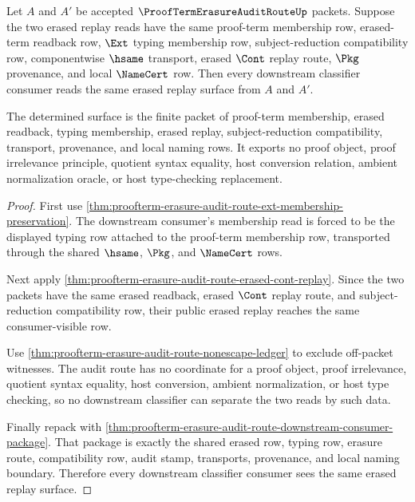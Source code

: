 \begin{theorem}
\label{thm:proof-term-erasure-audit-route-erased-replay-determinacy}
Let $A$ and $A'$ be accepted $\ProofTermErasureAuditRouteUp$ packets. Suppose the two erased replay reads have the same proof-term membership row, erased-term readback row, $\Ext$ typing membership row, subject-reduction compatibility row, componentwise $\hsame$ transport, erased $\Cont$ replay route, $\Pkg$ provenance, and local $\NameCert$ row. Then every downstream classifier consumer reads the same erased replay surface from $A$ and $A'$.

The determined surface is the finite packet of proof-term membership, erased readback, typing membership, erased replay, subject-reduction compatibility, transport, provenance, and local naming rows. It exports no proof object, proof irrelevance principle, quotient syntax equality, host conversion relation, ambient normalization oracle, or host type-checking replacement.
\end{theorem}
\begin{proof}
First use \autoref{thm:proofterm-erasure-audit-route-ext-membership-preservation}. The downstream consumer's membership read is forced to be the displayed typing row attached to the proof-term membership row, transported through the shared $\hsame$, $\Pkg$, and $\NameCert$ rows.

Next apply \autoref{thm:proofterm-erasure-audit-route-erased-cont-replay}. Since the two packets have the same erased readback, erased $\Cont$ replay route, and subject-reduction compatibility row, their public erased replay reaches the same consumer-visible row.

Use \autoref{thm:proofterm-erasure-audit-route-nonescape-ledger} to exclude off-packet witnesses. The audit route has no coordinate for a proof object, proof irrelevance, quotient syntax equality, host conversion, ambient normalization, or host type checking, so no downstream classifier can separate the two reads by such data.

Finally repack with \autoref{thm:proofterm-erasure-audit-route-downstream-consumer-package}. That package is exactly the shared erased row, typing row, erasure route, compatibility row, audit stamp, transports, provenance, and local naming boundary. Therefore every downstream classifier consumer sees the same erased replay surface.
\end{proof}

